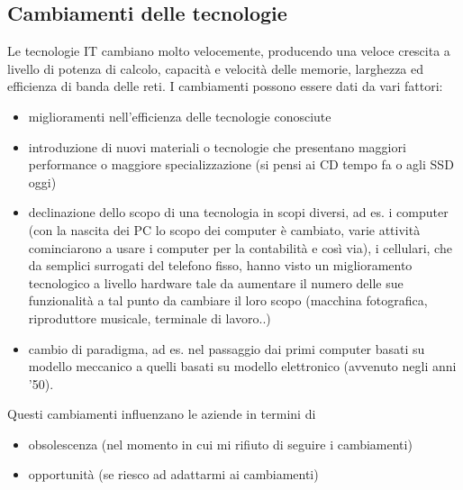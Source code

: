 \subsection{Cambiamenti delle tecnologie}
Le tecnologie IT cambiano molto velocemente, producendo una veloce crescita a livello di potenza di calcolo, capacit\`a e velocit\`a delle memorie, larghezza ed efficienza di banda delle reti.
I cambiamenti possono essere dati da vari fattori:
\begin{itemize}
\item miglioramenti nell'efficienza delle tecnologie conosciute
\item introduzione di nuovi materiali o tecnologie che presentano maggiori performance o maggiore specializzazione (si pensi ai CD tempo fa o agli SSD oggi)
\item declinazione dello scopo di una tecnologia in scopi diversi, ad es. i computer (con la nascita dei PC lo scopo dei computer \`e cambiato, varie attivit\`a cominciarono a usare i computer per la contabilit\`a e cos\`i via), i cellulari, che da semplici surrogati del telefono fisso, hanno visto un miglioramento tecnologico a livello hardware tale da aumentare il numero delle sue funzionalit\`a a tal punto da cambiare il loro scopo (macchina fotografica, riproduttore musicale, terminale di lavoro..)
\item cambio di paradigma, ad es. nel passaggio dai primi computer basati su modello meccanico a quelli basati su modello elettronico (avvenuto negli anni '50).
\end{itemize}

Questi cambiamenti influenzano le aziende in termini di
\begin{itemize}
  \item obsolescenza (nel momento in cui mi rifiuto di seguire i cambiamenti)
  \item opportunit\`a (se riesco ad adattarmi ai cambiamenti)
\end{itemize}

